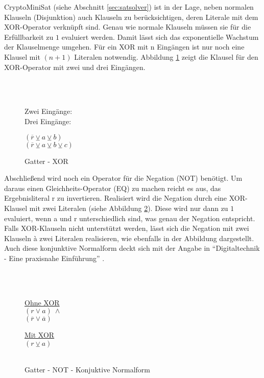 CryptoMiniSat (siehe Abschnitt \ref{sec:satsolver}) ist in der Lage, neben normalen Klauseln (Disjunktion) auch Klauseln zu berücksichtigen, deren Literale
mit dem XOR-Operator verknüpft sind. Genau wie normale Klauseln müssen sie für die Erfüllbarkeit zu $1$ evaluiert werden. Damit lässt sich das exponentielle
Wachstum der Klauselmenge umgehen. Für ein XOR mit n Eingängen ist nur noch eine Klausel mit $ (n + 1) $ Literalen notwendig. Abbildung \ref{fig:gatter_cnf_xor}
zeigt die Klausel für den XOR-Operator mit zwei und drei Eingängen.
\begin{figure}[!h]
  \centering
  \begin{minipage}[l]{1cm}
    ~\\
    ~
  \end{minipage}
  \begin{minipage}[l]{2.5cm}
    Zwei Eingänge:\\
    Drei Eingänge:
  \end{minipage}
  \begin{minipage}[l]{3cm}
    $ (\overline{r} \veebar a \veebar b) $\\
    $ (\overline{r} \veebar a \veebar b \veebar c) $
  \end{minipage}
  \caption{Gatter - XOR}
  \label{fig:gatter_cnf_xor}
\end{figure}

Abschließend wird noch ein Operator für die Negation (NOT) benötigt. Um daraus einen Gleichheits-Operator (EQ) zu machen reicht es aus, das Ergebnisliteral r zu invertieren.
Realisiert wird die Negation durch eine XOR-Klausel mit zwei Literalen (siehe Abbildung \ref{fig:gatter_not_cnf}). Diese wird nur dann zu $1$ evaluiert, wenn
a und r unterschiedlich sind, was genau der Negation entspricht. Falls XOR-Klauseln nicht unterstützt werden, lässt sich die Negation mit zwei Klauseln à zwei
Literalen realisieren, wie ebenfalls in der Abbildung dargestellt. Auch diese konjunktive Normalform deckt sich mit der Angabe in
"`Digitaltechnik - Eine praxisnahe Einführung"' \cite[164]{digitaltechnik}.
\begin{figure}[!h]
  \centering
  \begin{minipage}[l]{1cm}
    ~\\
    ~
  \end{minipage}
  \begin{minipage}[l]{2.5cm}
    \underline{Ohne XOR}\\
    $ (r \vee a) ~ \wedge $\\
    $ (\overline{r} \vee \overline{a}) $
  \end{minipage}
  \begin{minipage}[l]{2.5cm}
    \underline{Mit XOR}\\
    $ (r \veebar a) $\\
    ~
  \end{minipage}
  \caption{Gatter - NOT - Konjuktive Normalform}
  \label{fig:gatter_not_cnf}
\end{figure}